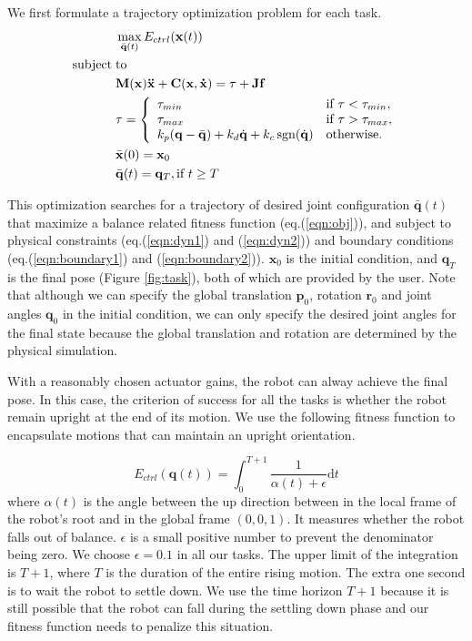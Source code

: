 We first formulate a trajectory optimization problem for each task.
\begin{align}
 \label{eqn:obj}&\max_{\bar{\mathbf{q}}(t)} E_{ctrl}(\mathbf{x}(t))\\
\nonumber  \mathrm{subject\;} &\mathrm{to} \\
\label{eqn:dyn1} & \mathbf{M}(\mathbf{x})\mathbf{\ddot{x}}+\mathbf{C}(\mathbf{x},\mathbf{\dot{x}}) =\tau + \mathbf{Jf}\\
\label{eqn:dyn2} &\tau =
  \left\{
    \begin{array}{ll}
      \tau_{min} & \text{if }\tau < \tau_{min},\\
      \tau_{max} & \text{if }\tau > \tau_{max},\\
      k_p(\mathbf{q}-\bar{\mathbf{q}}) + k_d\dot{\mathbf{q}} + k_c\operatorname{sgn}(\dot{\mathbf{q}}) & \text{otherwise.}\\
    \end{array}
  \right.\\
\label{eqn:boundary1}&\bar{\mathbf{x}}(0) = \mathbf{x}_0\\
\label{eqn:boundary2}&\bar{\mathbf{q}}(t) = \mathbf{q}_T, \text{if } t \geq T
\end{align}

This optimization searches for a trajectory of desired joint configuration $\bar{\mathbf{q}}(t)$ that maximize a balance related fitness function (eq.(\ref{eqn:obj})), and subject to physical constraints (eq.(\ref{eqn:dyn1}) and (\ref{eqn:dyn2})) and boundary conditions (eq.(\ref{eqn:boundary1}) and (\ref{eqn:boundary2})). $\mathbf{x}_0$ is the initial condition, and $\mathbf{q}_T$ is the final pose (Figure \ref{fig:task}), both of which are provided by the user. Note that although we can specify the global translation $\mathbf{p}_0$, rotation $\mathbf{r}_0$ and joint angles $\mathbf{q}_0$ in the initial condition, we can only specify the desired joint angles for the final state because the global translation and rotation are determined by the physical simulation.

With a reasonably chosen actuator gains, the robot can alway achieve the final pose. In this case, the criterion of success for all the tasks is whether the robot remain upright at the end of its motion. We use the following fitness function to encapsulate motions that can maintain an upright orientation.

\begin{equation}
  E_{ctrl}(\mathbf{q}(t))=\int_0^{T+1} \frac{1}{\alpha(t)+\epsilon}\mathrm{d}t
  \label{eqn:controllerObj}
\end{equation}
where $\alpha(t)$ is the angle between the up direction between in the local frame of the robot's root and in the global frame $(0,0,1)$. It measures whether the robot falls out of balance. $\epsilon$ is a small positive number to prevent the denominator being zero. We choose $\epsilon=0.1$ in all our tasks. The upper limit of the integration is $T+1$, where $T$ is the duration of the entire rising motion. The extra one second is to wait the robot to settle down. We use the time horizon $T+1$ because it is still possible that the robot can fall during the settling down phase and our fitness function needs to penalize this situation.

